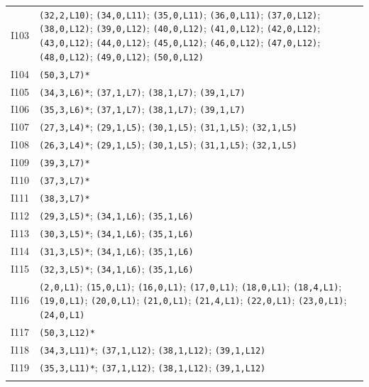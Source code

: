 {\begin{longtable}{@{}r p{14.7cm}@{}}
I103 & \texttt{(32,2,L10)}; \texttt{(34,0,L11)}; \texttt{(35,0,L11)}; \texttt{(36,0,L11)}; \texttt{(37,0,L12)}; \texttt{(38,0,L12)}; \texttt{(39,0,L12)}; \texttt{(40,0,L12)}; \texttt{(41,0,L12)}; \texttt{(42,0,L12)}; \texttt{(43,0,L12)}; \texttt{(44,0,L12)}; \texttt{(45,0,L12)}; \texttt{(46,0,L12)}; \texttt{(47,0,L12)}; \texttt{(48,0,L12)}; \texttt{(49,0,L12)}; \texttt{(50,0,L12)}\\\addlinespace[3pt]
I104 & \texttt{(50,3,L7)*}\\\addlinespace[3pt]
I105 & \texttt{(34,3,L6)*}; \texttt{(37,1,L7)}; \texttt{(38,1,L7)}; \texttt{(39,1,L7)}\\\addlinespace[3pt]
I106 & \texttt{(35,3,L6)*}; \texttt{(37,1,L7)}; \texttt{(38,1,L7)}; \texttt{(39,1,L7)}\\\addlinespace[3pt]
I107 & \texttt{(27,3,L4)*}; \texttt{(29,1,L5)}; \texttt{(30,1,L5)}; \texttt{(31,1,L5)}; \texttt{(32,1,L5)}\\\addlinespace[3pt]
I108 & \texttt{(26,3,L4)*}; \texttt{(29,1,L5)}; \texttt{(30,1,L5)}; \texttt{(31,1,L5)}; \texttt{(32,1,L5)}\\\addlinespace[3pt]
I109 & \texttt{(39,3,L7)*}\\\addlinespace[3pt]
I110 & \texttt{(37,3,L7)*}\\\addlinespace[3pt]
I111 & \texttt{(38,3,L7)*}\\\addlinespace[3pt]
I112 & \texttt{(29,3,L5)*}; \texttt{(34,1,L6)}; \texttt{(35,1,L6)}\\\addlinespace[3pt]
I113 & \texttt{(30,3,L5)*}; \texttt{(34,1,L6)}; \texttt{(35,1,L6)}\\\addlinespace[3pt]
I114 & \texttt{(31,3,L5)*}; \texttt{(34,1,L6)}; \texttt{(35,1,L6)}\\\addlinespace[3pt]
I115 & \texttt{(32,3,L5)*}; \texttt{(34,1,L6)}; \texttt{(35,1,L6)}\\\addlinespace[3pt]
I116 & \texttt{(2,0,L1)}; \texttt{(15,0,L1)}; \texttt{(16,0,L1)}; \texttt{(17,0,L1)}; \texttt{(18,0,L1)}; \texttt{(18,4,L1)}; \texttt{(19,0,L1)}; \texttt{(20,0,L1)}; \texttt{(21,0,L1)}; \texttt{(21,4,L1)}; \texttt{(22,0,L1)}; \texttt{(23,0,L1)}; \texttt{(24,0,L1)}\\\addlinespace[3pt]
I117 & \texttt{(50,3,L12)*}\\\addlinespace[3pt]
I118 & \texttt{(34,3,L11)*}; \texttt{(37,1,L12)}; \texttt{(38,1,L12)}; \texttt{(39,1,L12)}\\\addlinespace[3pt]
I119 & \texttt{(35,3,L11)*}; \texttt{(37,1,L12)}; \texttt{(38,1,L12)}; \texttt{(39,1,L12)}\\\addlinespace[3pt]

\end{longtable}}
